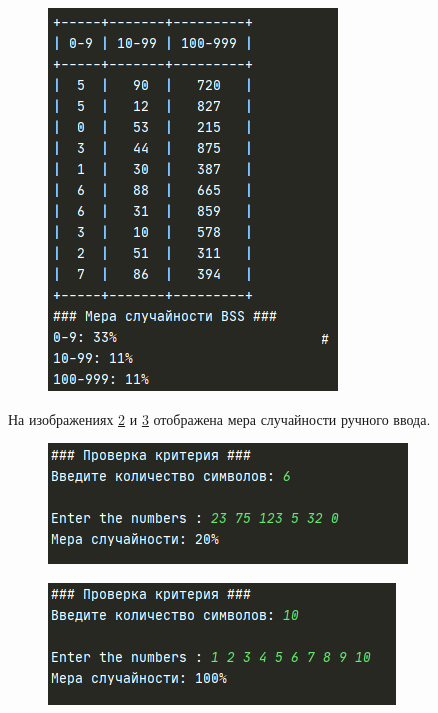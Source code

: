 \begin{figure}[!h]
	\centering
	\includegraphics[width=0.7\linewidth]{src/Table}
	\caption{}
	\label{fig:table}
\end{figure}

На изображениях \ref{fig:22} и \ref{fig:23} отображена мера случайности ручного ввода.

\begin{figure}[!h]
	\centering
	\includegraphics[width=0.7\linewidth]{src/Безымянный}
	\caption{}
	\label{fig:22}
\end{figure}

\begin{figure}[!h]
	\centering
	\includegraphics[width=0.7\linewidth]{"src/Мера 1"}
	\caption{}
	\label{fig:23}
\end{figure}







